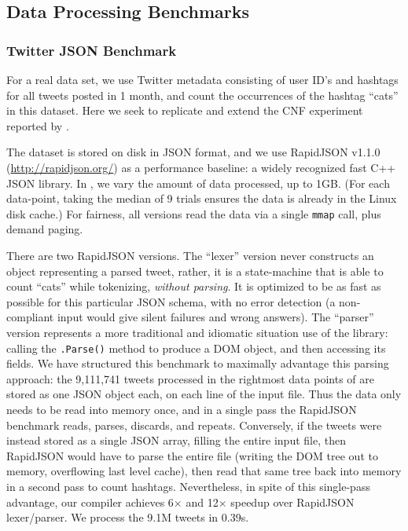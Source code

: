 \documentclass[showabstract,showacknowledgments,showpreface,showdedication]{iuphd}
\theoremstyle{nonumberplain}
\newcommand{\il}[1]{\lstinline[style=inline,mathescape=true];#1;}
\begin{document}
\subsection{Data Processing Benchmarks}

 

\subsubsection{Twitter JSON Benchmark}

For a real data set, we
use Twitter metadata consisting of user ID's and hashtags for all tweets posted
in 1 month, and count the occurrences of the hashtag ``cats'' in this dataset.
Here we seek to replicate and extend the CNF experiment reported by
\cite{cnf-icfp15}.

The dataset is stored on disk in JSON format, and we use RapidJSON
v1.1.0 ({\footnotesize\url{http://rapidjson.org/}}) as a performance baseline: a widely
recognized fast C++ JSON library.
%
In , we vary the amount of data processed,
up to 1GB.  (For each data-point, taking the median of 9 trials
ensures the data is already in the Linux disk cache.)
%
For fairness, all versions read the data via a single \il{mmap} call, plus
demand paging.

There are two RapidJSON versions. The ``lexer'' version never constructs an
object representing a parsed tweet, rather, it is a state-machine
that is able to count ``cats'' while tokenizing, {\em without parsing}.  It is
optimized to be as fast as possible for this particular JSON schema, with no
error detection (a non-compliant input would give silent failures and wrong
answers).
%
The ``parser'' version represents a more traditional and idiomatic situation use
of the library: calling the \il{.Parse()} method to produce a DOM object, and
then accessing its fields.
%
We have structured this benchmark to maximally advantage this parsing approach:
the 9,111,741 tweets processed in the rightmost data points of  are stored as one JSON object each, on each line of the input file.
%
Thus the data only needs to be read into memory once, and in a single pass the RapidJSON benchmark reads, parses, discards, and repeats.
%
Conversely, if the tweets were instead stored as a single JSON array, filling
the entire input file, then RapidJSON would have to parse the entire file
(writing the DOM tree out to memory, overflowing last level cache), then read
that same tree back into memory in a second pass to count hashtags.
%
Nevertheless, in spite of this single-pass advantage, our compiler achieves
6$\times$ and 12$\times$ speedup over RapidJSON lexer/parser.
%
We process the 9.1M tweets in 0.39s.
\end{document}
